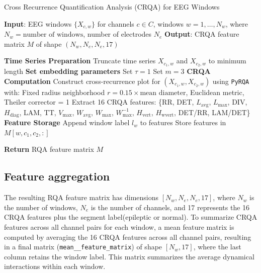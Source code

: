 \documentclass{article}
\begin{document}
				\begin{algorithm}
				\caption{Cross Recurrence Quantification Analysis (CRQA) for EEG Windows}
				\label{alg:crqa_computation}
				\begin{algorithmic}[1]
				\State \textbf{Input}: EEG windows \( \{X_{c,w}\} \) for channels \( c \in C \), windows \( w = 1, \dots, N_w \), 
					where \( N_w = \text{number of windows} \), number of electrodes \( N_e \)
				\State \textbf{Output}: CRQA feature matrix \( M \) of shape \( (N_w, N_e, N_e, 17) \)

					\State \textbf{Time Series Preparation}
					\State Truncate time series \( X_{c_1,w} \) and \( X_{c_2,w} \) to minimum length
					\State \textbf{Set embedding parameters}
					\State Set \( \tau = 1 \)
					\State Set \( m = 3 \)
					\State \textbf{CRQA Computation}
					\State Construct cross-recurrence plot for \( (X_{c_1,w}, X_{c_2,w}) \) using \texttt{PyRQA} with:
					\State \quad Fixed radius neighborhood \( r = 0.15 \times \text{mean diameter} \), Euclidean metric, Theiler corrector = 1
					\State Extract 16 CRQA features: \{RR, DET, \( L_{\text{avg}} \), \( L_{\text{max}} \), DIV, \( H_{\text{diag}} \), LAM, 
					TT, \( V_{\text{max}} \), \( W_{\text{avg}} \), \( W_{\text{max}} \), 
					\( W_{\text{max}}^{-1} \), \( H_{\text{vert}} \), \( H_{\text{wvert}} \), DET/RR, LAM/DET\}
					\State \textbf{Feature Storage}
					\State Append window label \( l_w \) to features
					\State Store features in \( M[w, c_1, c_2, :] \)
				    \EndFor
				\EndFor

				\State \textbf{Return} RQA feature matrix \( M \)
				\end{algorithmic}
				\end{algorithm}

				 \subsection{Feature aggregation}
				 \label{subsec:feature_aggregation}
				 The resulting RQA feature matrix has dimensions \([N_w, N_e, N_e, 17]\), where \(N_w\) is the number of windows, 
				\(N_e\) is the number of channels, and 17 represents the 16 CRQA features plus the segment label(epileptic or normal). 
				 To summarize CRQA features across all channel pairs for each window, 
				 a mean feature matrix is computed by averaging the 16 CRQA features across all channel pairs, 
				 resulting in a final matrix (\texttt{mean\_\_feature\_matrix}) of shape \([N_w, 17]\), where the last column retains the window label. 
				 This matrix summarizes the average dynamical interactions within each window.
\end{document}
